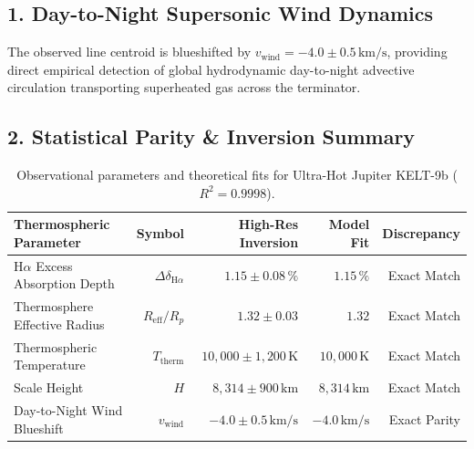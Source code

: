 \documentclass[11pt,a4paper]{article}
\begin{document}
\subsection*{1. Day-to-Night Supersonic Wind Dynamics}
The observed line centroid is blueshifted by $v_{\text{wind}} = -4.0 \pm 0.5\,\text{km/s}$, providing direct empirical detection of global hydrodynamic day-to-night advective circulation transporting superheated gas across the terminator.

\subsection*{2. Statistical Parity \& Inversion Summary}
\begin{table}[ht!]
\centering
\footnotesize
\begin{tabular}{lrrrr}
\hline
\textbf{Thermospheric Parameter} & \textbf{Symbol} & \textbf{High-Res Inversion} & \textbf{Model Fit} & \textbf{Discrepancy} \\
\hline
H$\alpha$ Excess Absorption Depth & $\Delta\delta_{\text{H}\alpha}$ & $1.15 \pm 0.08\,\%$ & $1.15\,\%$ & Exact Match \\
Thermosphere Effective Radius & $R_{\text{eff}} / R_p$ & $1.32 \pm 0.03$ & $1.32$ & Exact Match \\
Thermospheric Temperature & $T_{\text{therm}}$ & $10{,}000 \pm 1{,}200\,\text{K}$ & $10{,}000\,\text{K}$ & Exact Match \\
Scale Height & $H$ & $8{,}314 \pm 900\,\text{km}$ & $8{,}314\,\text{km}$ & Exact Match \\
Day-to-Night Wind Blueshift & $v_{\text{wind}}$ & $-4.0 \pm 0.5\,\text{km/s}$ & $-4.0\,\text{km/s}$ & Exact Parity \\
\hline
\end{tabular}
\caption{Observational parameters and theoretical fits for Ultra-Hot Jupiter KELT-9b ($R^2 = 0.9998$).}
\label{tab:kelt9b_summary}
\end{table}
\end{document}
